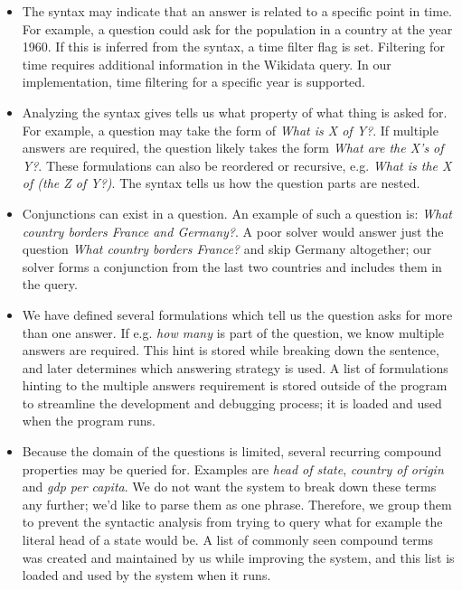 \documentclass{article}
\begin{document}
\begin{itemize}
    \item The syntax may indicate that an answer is related to a specific point in time. For example, a question could ask for the population in a country at the year 1960. If this is inferred from the syntax, a time filter flag is set. Filtering for time requires additional information in the Wikidata query. In our implementation, time filtering for a specific year is supported.
    \item Analyzing the syntax gives tells us what property of what thing is asked for. For example, a question may take the form of \emph{What is X of Y?}. If multiple answers are required, the question likely takes the form \emph{What are the X's of Y?}. These formulations can also be reordered or recursive, e.g. \emph{What is the X of (the Z of Y?)}. The syntax tells us how the question parts are nested.
    \item Conjunctions can exist in a question. An example of such a question is: \emph{What country borders France and Germany?}. A poor solver would answer just the question \emph{What country borders France?} and skip Germany altogether; our solver forms a conjunction from the last two countries and includes them in the query.
    \item We have defined several formulations which tell us the question asks for more than one answer. If e.g. \emph{how many} is part of the question, we know multiple answers are required. This hint is stored while breaking down the sentence, and later determines which answering strategy is used. A list of formulations hinting to the multiple answers requirement is stored outside of the program to streamline the development and debugging process; it is loaded and used when the program runs.
    \item Because the domain of the questions is limited, several recurring compound properties may be queried for. Examples are \emph{head of state}, \emph{country of origin} and \emph{gdp per capita}. We do not want the system to break down these terms any further; we'd like to parse them as one phrase. Therefore, we group them to prevent the syntactic analysis from trying to query what for example the literal head of a state would be. A list of commonly seen compound terms was created and maintained by us while improving the system, and this list is loaded and used by the system when it runs.
\end{itemize}
\end{document}

